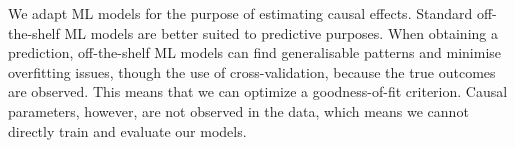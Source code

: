 \documentclass[12pt, a4paper]{article}
\begin{document}
%
%
%

We adapt ML models for the purpose of estimating causal effects. Standard
off-the-shelf ML models are better suited to predictive purposes. When
obtaining a prediction, off-the-shelf ML models can find generalisable patterns
and minimise overfitting issues, though the use of cross-validation, because
the true outcomes are observed. This means that we can optimize a
goodness-of-fit criterion. Causal parameters, however, are not observed in the
data, which means we cannot directly train and evaluate our models. 
\end{document}
